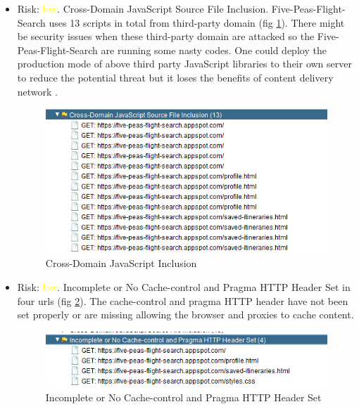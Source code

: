 \documentclass[12pt, a4paper]{article}
\begin{document}
\begin{itemize}
    \item Risk: \textcolor{yellow}{low}. Cross-Domain JavaScript Source File Inclusion. Five-Peas-Flight-Search uses 13 scripts
    in total from third-party domain (fig \ref{fig:zap_cdjs}). There might be security issues when these third-party domain are attacked so the Five-Peas-Flight-Search are running some nasty codes. One could deploy the production mode of above third party JavaScript libraries to their own server to reduce the potential threat but it loses the benefits of content delivery network . 
    \begin{figure}[ht]
    \centering
    \includegraphics[width=\textwidth, frame]{zap_cdjs.png}
    \caption{Cross-Domain JavaScript Inclusion}
    \label{fig:zap_cdjs}
    \end{figure}
    
    \item Risk: \textcolor{yellow}{low}. Incomplete or No Cache-control and Pragma HTTP Header Set in four urls (fig \ref{fig:zap_cache_control}). The cache-control and pragma HTTP header have not been set properly or are missing allowing the browser and proxies to cache content.
    \begin{figure}[ht]
    \centering
    \includegraphics[width=\textwidth, frame]{zap_cache_control.png}
    \caption{Incomplete or No Cache-control and Pragma HTTP Header Set}
    \label{fig:zap_cache_control}
    \end{figure}


\end{itemize}
\end{document}
